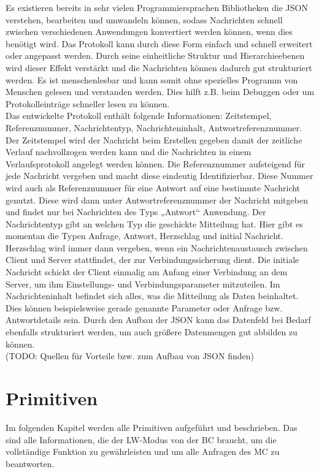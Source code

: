 \documentclass[thesis.tex]{subfiles}
\begin{document}
Es existieren bereits in sehr vielen Programmiersprachen Bibliotheken die JSON verstehen, bearbeiten und umwandeln können,
sodass Nachrichten schnell zwischen verschiedenen Anwendungen konvertiert werden können, wenn dies benötigt wird.
Das Protokoll kann durch diese Form einfach und schnell erweitert oder angepasst werden.
Durch seine einheitliche Struktur und Hierarchieebenen wird dieser Effekt verstärkt und die Nachrichten können dadurch gut strukturiert werden.
Es ist menschenlesbar und kann somit ohne spezielles Programm von Menschen gelesen und verstanden werden.
Dies hilft z.B. beim Debuggen oder um Protokolleinträge schneller lesen zu können.
\\

Das entwickelte Protokoll enthält folgende Informationen: Zeitstempel, Referenznummer, Nachrichtentyp, Nachrichteninhalt, Antwortreferenznummer.
Der Zeitstempel wird der Nachricht beim Erstellen gegeben damit der zeitliche Verlauf nachvollzogen werden kann und die
Nachrichten in einem Verlaufsprotokoll angelegt werden können.
Die Referenznummer aufsteigend für jede Nachricht vergeben und macht diese eindeutig Identifizierbar.
Diese Nummer wird auch als Referenznummer für eine Antwort auf eine bestimmte Nachricht genutzt.
Diese wird dann unter Antwortreferenznummer der Nachricht mitgeben und findet nur bei Nachrichten des Typs „Antwort“ Anwendung.
Der Nachrichtentyp gibt an welchen Typ die geschickte Mitteilung hat.
Hier gibt es momentan die Typen Anfrage, Antwort, Herzschlag und initial Nachricht.
Herzschlag wird immer dann vergeben, wenn ein Nachrichtenaustausch zwischen Client und Server stattfindet, der zur Verbindungssicherung dient.
Die initiale Nachricht schickt der Client einmalig am Anfang einer Verbindung an dem Server,
um ihm Einstellungs- und Verbindungsparameter mitzuteilen.
Im Nachrichteninhalt befindet sich alles, was die Mitteilung als Daten beinhaltet.
Dies können beispielsweise gerade genannte Parameter oder Anfrage bzw. Antwortdetails sein.
Durch den Aufbau der JSON kann das Datenfeld bei Bedarf ebenfalls strukturiert werden, um auch größere Datenmengen gut abbilden zu können.
\\

(TODO: Quellen für Vorteile bzw. zum Aufbau von JSON finden)

\section{Primitiven}
Im folgenden Kapitel werden alle Primitiven aufgeführt und beschrieben.
Das sind alle Informationen, die der LW-Modus von der BC braucht, um die vollständige Funktion zu gewährleisten
und um alle Anfragen des MC zu beantworten.
\\
\end{document}
